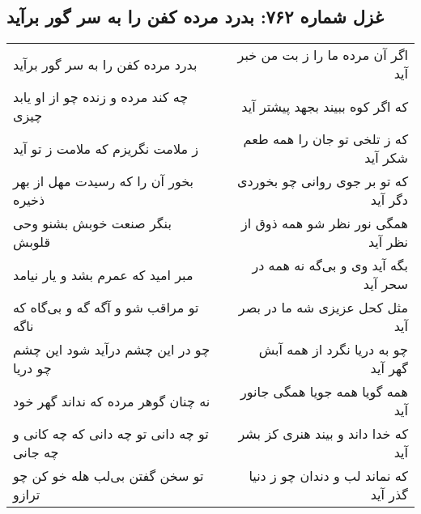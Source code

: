 \begin{center}
\section*{غزل شماره ۷۶۲: بدرد مرده کفن را به سر گور برآید}
\label{sec:0762}
\begin{longtable}{l p{0.5cm} r}
بدرد مرده کفن را به سر گور برآید
&&
اگر آن مرده ما را ز بت من خبر آید
\\
چه کند مرده و زنده چو از او یابد چیزی
&&
که اگر کوه ببیند بجهد پیشتر آید
\\
ز ملامت نگریزم که ملامت ز تو آید
&&
که ز تلخی تو جان را همه طعم شکر آید
\\
بخور آن را که رسیدت مهل از بهر ذخیره
&&
که تو بر جوی روانی چو بخوردی دگر آید
\\
بنگر صنعت خوبش بشنو وحی قلوبش
&&
همگی نور نظر شو همه ذوق از نظر آید
\\
مبر امید که عمرم بشد و یار نیامد
&&
بگه آید وی و بی‌گه نه همه در سحر آید
\\
تو مراقب شو و آگه گه و بی‌گاه که ناگه
&&
مثل کحل عزیزی شه ما در بصر آید
\\
چو در این چشم درآید شود این چشم چو دریا
&&
چو به دریا نگرد از همه آبش گهر آید
\\
نه چنان گوهر مرده که نداند گهر خود
&&
همه گویا همه جویا همگی جانور آید
\\
تو چه دانی تو چه دانی که چه کانی و چه جانی
&&
که خدا داند و بیند هنری کز بشر آید
\\
تو سخن گفتن بی‌لب هله خو کن چو ترازو
&&
که نماند لب و دندان چو ز دنیا گذر آید
\\
\end{longtable}
\end{center}
